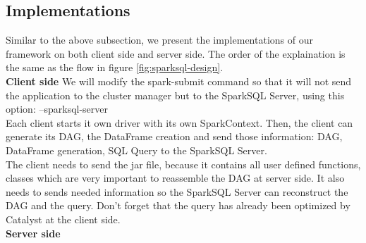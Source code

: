 \subsection{Implementations}
Similar to the above subsection, we present the implementations of our framework on both client side and server side. The order of the explaination is the same as the flow in figure \ref{fig:sparksql-design}.\\
\textbf{Client side} We will modify the spark-submit command so that it will not send the application to the cluster manager but to the SparkSQL Server, using this option:  --sparksql-server\\
Each client starts it own driver with its own SparkContext. Then, the client can generate its DAG, the DataFrame creation and send those information: DAG, DataFrame generation, SQL Query to the SparkSQL Server.\\
The client needs to send the jar file, because it contains all user defined functions, classes which are very important to reassemble the DAG at server side. It also needs to sends needed information so the SparkSQL Server can reconstruct the DAG and the query. Don’t forget that the query has already been optimized by Catalyst at the client side.\\
\textbf{Server side}
